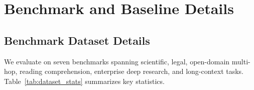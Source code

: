 \section{Benchmark and Baseline Details}
\label{app:benchmark_baseline_details}

\begin{table}[t]
    \centering
    \caption{Statistics of the seven benchmark datasets used in our evaluation. ``Avg.\ Doc.\ Len.'' reports average document length in characters. ``\#Queries (eval)'' refers to the number of queries used in our experiments. ``Multi-hop'' indicates whether the benchmark requires cross-document reasoning.}
    \label{tab:dataset_stats}
    \vspace{-1em}
\end{table}

\subsection{Benchmark Dataset Details}
\label{app:benchmarks}

We evaluate \name{} on seven benchmarks spanning scientific, legal, open-domain multi-hop, reading comprehension, enterprise deep research, and long-context tasks. Table~\ref{tab:dataset_stats} summarizes key statistics.

